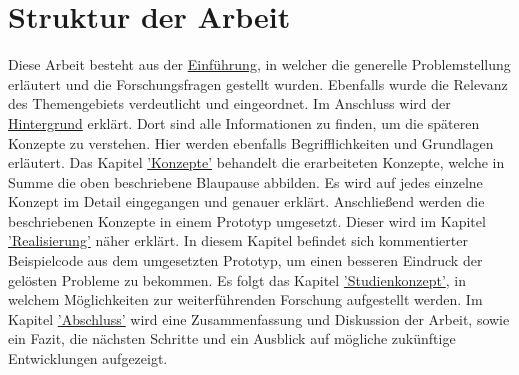 \section{Struktur der Arbeit}

Diese Arbeit besteht aus der \hyperref[sec:einfuehrung]{Einführung}, in welcher die generelle Problemstellung erläutert und die Forschungsfragen gestellt wurden. Ebenfalls wurde die Relevanz des Themengebiets verdeutlicht und eingeordnet. Im Anschluss wird der \hyperref[sec:hintergrund]{Hintergrund} erklärt. Dort sind alle Informationen zu finden, um die späteren Konzepte zu verstehen. Hier werden ebenfalls Begrifflichkeiten und Grundlagen erläutert. Das Kapitel \hyperref[sec:konzepte]{'Konzepte'} behandelt die erarbeiteten Konzepte, welche in Summe die oben beschriebene Blaupause abbilden. Es wird auf jedes einzelne Konzept im Detail eingegangen und genauer erklärt. Anschließend werden die beschriebenen Konzepte in einem Prototyp umgesetzt. Dieser wird im Kapitel \hyperref[sec:realisierung]{'Realisierung'} näher erklärt. In diesem Kapitel befindet sich kommentierter Beispielcode aus dem umgesetzten Prototyp, um einen besseren Eindruck der gelösten Probleme zu bekommen. Es folgt das Kapitel \hyperref[studienkonzept]{'Studienkonzept'}, in welchem Möglichkeiten zur weiterführenden Forschung aufgestellt werden. Im Kapitel \hyperref[sec:abschluss]{'Abschluss'} wird eine Zusammenfassung und Diskussion der Arbeit, sowie ein Fazit, die nächsten Schritte und ein Ausblick auf mögliche zukünftige Entwicklungen aufgezeigt.
